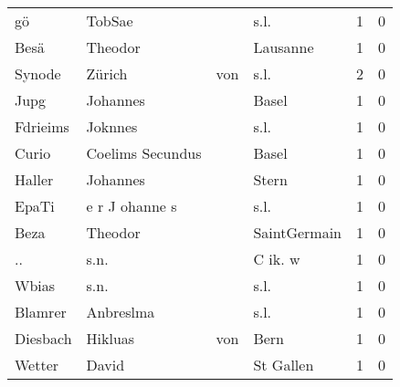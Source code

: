 \begin{center}
\begin{tiny}
\begin{longtabu}{llllrr}
                       gö &                             TobSae &             &                                        s.l. &          1 &         0 \\
                     Besä &                            Theodor &             &                                    Lausanne &          1 &         0 \\
                   Synode &                             Zürich &         von &                                        s.l. &          2 &         0 \\
                     Jupg &                           Johannes &             &                                       Basel &          1 &         0 \\
                 Fdrieims &                            Joknnes &             &                                        s.l. &          1 &         0 \\
                    Curio &                   Coelims Secundus &             &                                       Basel &          1 &         0 \\
                   Haller &                           Johannes &             &                                       Stern &          1 &         0 \\
                    EpaTi &                     e r J ohanne s &             &                                        s.l. &          1 &         0 \\
                     Beza &                            Theodor &             &                                SaintGermain &          1 &         0 \\
                       .. &                               s.n. &             &                                     C ik. w &          1 &         0 \\
                    Wbias &                               s.n. &             &                                        s.l. &          1 &         0 \\
                  Blamrer &                          Anbreslma &             &                                        s.l. &          1 &         0 \\
                 Diesbach &                            Hikluas &         von &                                        Bern &          1 &         0 \\
                   Wetter &                              David &             &                                   St Gallen &          1 &         0 \\

\end{longtabu}
\end{tiny}
\end{center}
